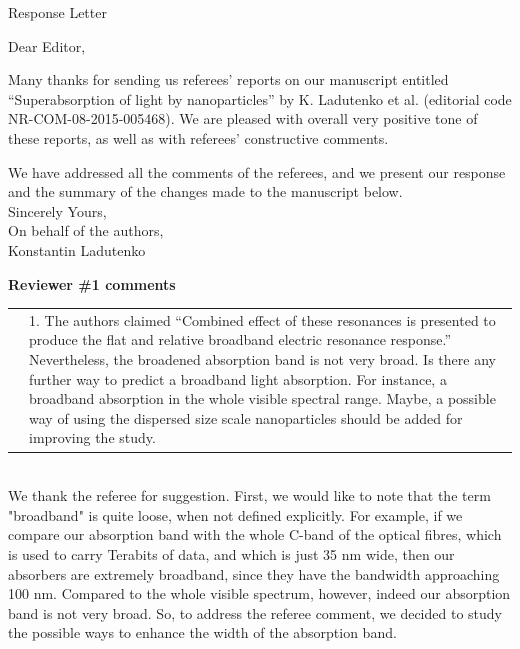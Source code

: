 \documentclass[a4paper]{article}
\begin{document}
\begin{center}
  Response Letter
\end{center}
Dear Editor,
\vspace{10pt}

Many thanks for sending us referees’ reports on our manuscript
entitled “Superabsorption of light by nanoparticles” by K. Ladutenko
et al. (editorial code NR-COM-08-2015-005468). We are pleased with
overall very positive tone of these reports, as well as with referees’
constructive comments.

We have addressed all the comments of the referees, and we present our
response and the summary of the changes made to the manuscript below.
\vspace{10pt}
\\
Sincerely Yours,\\
On behalf of the authors,\\
Konstantin Ladutenko


\vspace{10pt}

\newpage
\textbf{Reviewer \#1 comments}

\begin{tabular}[!H]{l|p{}}
\quad & 1. The authors claimed “Combined effect of these resonances is
presented to produce the flat and relative broadband electric
resonance response.” Nevertheless, the broadened absorption band is
not very broad. Is there any further way to predict a broadband light
absorption. For instance, a broadband absorption in the whole visible
spectral range. Maybe, a possible way of using the dispersed size
scale nanoparticles should be added for improving the study.
\end{tabular}\\

We thank the referee for suggestion. First, we would like to note that
the term "broadband" is quite loose, when not defined explicitly. For
example, if we compare our absorption band with the whole C-band of
the optical fibres, which is used to carry Terabits of data, and which
is just 35 nm wide, then our absorbers are extremely broadband, since
they have the bandwidth approaching 100 nm. Compared to the whole
visible spectrum, however, indeed our absorption band is not very
broad. So, to address the referee comment, we decided to study the
possible ways to enhance the width of the absorption band.
\end{document}
